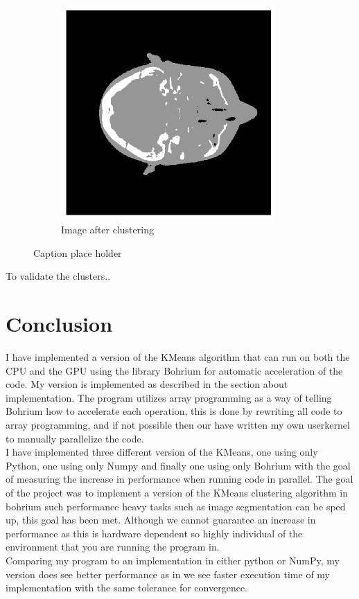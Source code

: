 \documentclass[12pt]{report}
\begin{document}
\begin{figure}[h]
\begin{subfigure}[t]{0.5\textwidth}
        \includegraphics[width=0.9\textwidth]{images/clustering512.png}
        \caption{Image after clustering}
    \end{subfigure}
    \caption{Caption place holder}
\end{figure}
To validate the clusters..




\chapter{Conclusion}
\label{sec:label}
I have implemented a version of the KMeans algorithm that can run on both the CPU and the GPU using the library Bohrium for automatic acceleration of the code. My version is implemented as described in the section about implementation. The program utilizes array programming as a way of telling Bohrium how to accelerate each operation, this is done by rewriting all code to array programming, and if not possible then our have written my own userkernel to manually parallelize the code. \\
I have implemented three different version of the KMeans, one using only Python, one using only Numpy and finally one using only Bohrium with the goal of measuring the increase in performance when running code in parallel. The goal of the project was to implement a version of the KMeans clustering algorithm in bohrium such performance heavy tasks such as image segmentation can be sped up, this goal has been met. Although we cannot guarantee an increase in performance as this is hardware dependent so highly individual of the environment that you are running the program in. \\
Comparing my program to an implementation in either python or NumPy, my version does see better performance as in we see faster execution time of my implementation with the same tolerance for convergence. \\ \\
\end{document}
